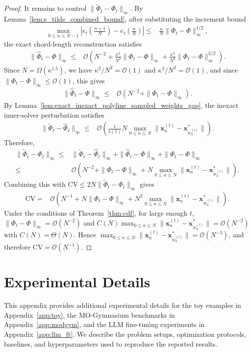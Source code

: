\documentclass{article}
\newcommand{\Oc}{\mathcal{O}}
\newcommand{\bx}{\mathbf{x}}
\begin{document}
\begin{proof}
It remains to control $\|\tilde\Phi_t-\Phi_t\|_\infty$. By Lemma~\ref{lem:s_tilde_combined_bound}, after substituting the increment bound
\begin{align}
\max_{0\le n\le N-1}\left|e_t\left(\frac{n+1}{N}\right)-e_t\left(\frac nN\right)\right|
\leq&\frac{\kappa}{N}\|\Phi_t-\Phi\|_\infty^{1/2},
\end{align}
the exact chord-length reconstruction satisfies
\begin{align}
\|\hat\Phi_t-\Phi\|_\infty
\leq&\Oc\left(N^{-2}+\frac{\kappa^2}{N^2}\|\Phi_t-\Phi\|_\infty+\frac{\kappa^3}{N^2}\|\Phi_t-\Phi\|_\infty^{3/2}\right).
\end{align}
Since $N=\Omega(\kappa^{1.5})$, we have $\kappa^2/N^2=\Oc(1)$ and $\kappa^3/N^2=\Oc(1)$, and since $\|\Phi_t-\Phi\|_\infty\le \Oc(1)$, this gives
\begin{align}
\|\hat\Phi_t-\Phi\|_\infty
\leq&\Oc\left(N^{-2}+\|\Phi_t-\Phi\|_\infty\right).
\end{align}
By Lemma~\ref{lem:exact_inexact_polyline_sampled_weights_gap}, the inexact inner-solver perturbation satisfies
\begin{align}
\|\tilde\Phi_t-\hat\Phi_t\|_\infty
\leq&\Oc\left(\frac1{s(1)}N\max_{0\le n\le N}\|\bx_n^{(t)}-\bx_{w_n^{(t)}}^*\|\right).
\end{align}
Therefore,
\begin{align}
\|\tilde\Phi_t-\Phi_t\|_\infty
\leq&\|\tilde\Phi_t-\hat\Phi_t\|_\infty+\|\hat\Phi_t-\Phi\|_\infty+\|\Phi_t-\Phi\|_\infty \nonumber\\
\leq&\Oc\left(N^{-2}+\|\Phi_t-\Phi\|_\infty+N\max_{0\le n\le N}\|\bx_n^{(t)}-\bx_{w_n^{(t)}}^*\|\right).
\end{align}
Combining this with $\mathrm{CV}\le 2N\|\tilde\Phi_t-\Phi_t\|_\infty$ gives
\begin{align}
\mathrm{CV}
=&\Oc\left(N^{-1}+N\|\Phi_t-\Phi\|_\infty+N^2\max_{0\le n\le N}\|\bx_n^{(t)}-\bx_{w_n^{(t)}}^*\|\right).
\end{align}
Under the conditions of Theorem~\ref{thm:cdf}, for large enough $t$, $\|\Phi_t-\Phi\|_\infty=\Oc(N^{-2})$ and $C(N)\max_{0\le n\le N}\|\bx_n^{(t)}-\bx_{w_n^{(t)}}^*\|=\Oc(N^{-2})$ with $C(N)=\Theta(N)$. Hence $\max_{0\le n\le N}\|\bx_n^{(t)}-\bx_{w_n^{(t)}}^*\|=\Oc(N^{-3})$, and therefore $\mathrm{CV}=\Oc(N^{-1})$.
\end{proof}




\section{Experimental Details}
\label{app:exp_details}
This appendix provides additional experimental details for the toy examples in Appendix~\ref{app:toy}, the MO-Gymnasium benchmarks in Appendix~\ref{app:modgym}, and the LLM fine-tuning experiments in Appendix~\ref{app:llm_ft}. We describe the problem setups, optimization protocols, baselines, and hyperparameters used to reproduce the reported results.
\end{document}
